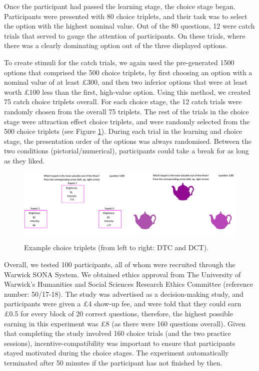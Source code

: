 \documentclass[11pt,a4paper]{article}
\begin{document}
Once the participant had passed the learning stage, the choice stage began. Participants were presented with 80 choice triplets, and their task was to select the option with the highest nominal value. Out of the 80 questions, 12 were catch trials that served to gauge the attention of participants. On these trials, where there was a clearly dominating option out of the three displayed options. 

To create stimuli for the catch trials, we again used the pre-generated 1500 options that comprised the 500 choice triplets, by first choosing an option with a nominal value of at least £300, and then two inferior options that were at least worth £100 less than the first, high-value option. Using this method, we created 75 catch choice triplets overall. For each choice stage, the 12 catch trials were randomly chosen from the overall 75 triplets. The rest of the trials in the choice stage were attraction effect choice triplets, and were randomly selected from the 500 choice triplets (see Figure \ref{fig:choicetriplets}). During each trial in the learning and choice stage, the presentation order of the options was always randomised. Between the two conditions (pictorial/numerical), participants could take a break for as long as they liked.

\begin{figure}[htp!]
\centering
\caption{Example choice triplets (from left to right: DTC and DCT).}
\includegraphics[width=1\textwidth]{./choice_triplets.png}
\label{fig:choicetriplets}
\end{figure}


Overall, we tested 100 participants, all of whom were recruited through the Warwick SONA System.  We obtained ethics approval from The University of Warwick’s Humanities and Social Sciences Research Ethics Committee (reference number: 50/17-18). The study was advertised as a decision-making study, and participants were given a £4 show-up fee, and were told that they could earn £0.5 for every block of 20 correct questions, therefore, the highest possible earning in this experiment was £8 (as there were 160 questions overall). Given that completing the study involved 160 choice trials (and the two practice sessions), incentive-compatibility was important to ensure that participants stayed motivated during the choice stages. The experiment automatically terminated after 50 minutes if the participant has not finished by then. 
\end{document}
